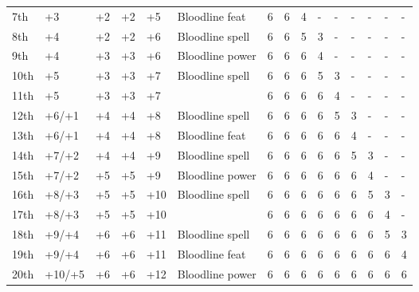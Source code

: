 \begin{table*}[]
\begin{tabularx}{\linewidth}{lp{6em}p{2.5em}p{2.5em}p{2.5em}Xlllllllll}
7th & +3 & +2 & +2 & +5 & Bloodline feat & 6 & 6 & 4 & - & - & - & - & - & -\\
8th & +4 & +2 & +2 & +6 & Bloodline spell & 6 & 6 & 5 & 3 & - & - & - & - & -\\
9th & +4 & +3 & +3 & +6 & Bloodline power & 6 & 6 & 6 & 4 & - & - & - & - & -\\
10th & +5 & +3 & +3 & +7 & Bloodline spell & 6 & 6 & 6 & 5 & 3 & - & - & - & -\\
11th & +5 & +3 & +3 & +7 &  & 6 & 6 & 6 & 6 & 4 & - & - & - & -\\
12th & +6/+1 & +4 & +4 & +8 & Bloodline spell & 6 & 6 & 6 & 6 & 5 & 3 & - & - & -\\
13th & +6/+1 & +4 & +4 & +8 & Bloodline feat & 6 & 6 & 6 & 6 & 6 & 4 & - & - & -\\
14th & +7/+2 & +4 & +4 & +9 & Bloodline spell & 6 & 6 & 6 & 6 & 6 & 5 & 3 & - & -\\
15th & +7/+2 & +5 & +5 & +9 & Bloodline power & 6 & 6 & 6 & 6 & 6 & 6 & 4 & - & -\\
16th & +8/+3 & +5 & +5 & +10 & Bloodline spell & 6 & 6 & 6 & 6 & 6 & 6 & 5 & 3 & -\\
17th & +8/+3 & +5 & +5 & +10 &  & 6 & 6 & 6 & 6 & 6 & 6 & 6 & 4 & -\\
18th & +9/+4 & +6 & +6 & +11 & Bloodline spell & 6 & 6 & 6 & 6 & 6 & 6 & 6 & 5 & 3\\
19th & +9/+4 & +6 & +6 & +11 & Bloodline feat & 6 & 6 & 6 & 6 & 6 & 6 & 6 & 6 & 4\\
20th & +10/+5 & +6 & +6 & +12 & Bloodline power & 6 & 6 & 6 & 6 & 6 & 6 & 6 & 6 & 6\\
\end{tabularx}
\end{table*}

